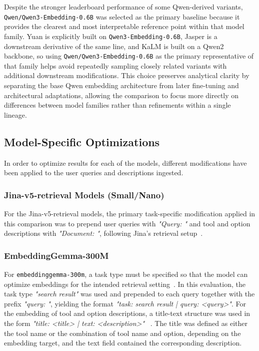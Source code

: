 Despite the stronger leaderboard performance of some Qwen-derived variants, \texttt{Qwen/Qwen3-Embedding-0.6B} was selected as the primary baseline because it provides the clearest and most interpretable reference point within that model family. Yuan is explicitly built on \texttt{Qwen3-Embedding-0.6B}, Jasper is a downstream derivative of the same line, and KaLM is built on a Qwen2 backbone, so using \texttt{Qwen/Qwen3-Embedding-0.6B} as the primary representative of that family helps avoid repeatedly sampling closely related variants with additional downstream modifications. This choice preserves analytical clarity by separating the base Qwen embedding architecture from later fine-tuning and architectural adaptations, allowing the comparison to focus more directly on differences between model families rather than refinements within a single lineage.

\subsection{Model-Specific Optimizations}\label{sec:model_spec_opt}

In order to optimize results for each of the models, different modifications have been applied to the user queries and descriptions ingested.

\subsubsection{Jina-v5-retrieval Models (Small/Nano)}
For the Jina-v5-retrieval models, the primary task-specific modification applied in this comparison was to prepend user queries with \textit{"Query: "} and tool and option descriptions with \textit{"Document: "}, following Jina's retrieval setup~\cite{akram2026jina}.

\subsubsection{EmbeddingGemma-300M}
For \texttt{embeddinggemma-300m}, a task type must be specified so that the model can optimize embeddings for the intended retrieval setting~\cite{vera2025embeddinggemma}. In this evaluation, the task type \textit{"search result"} was used and prepended to each query together with the prefix \textit{"query: "}, yielding the format \textit{"task: search result | query: <query>"}. For the embedding of tool and option descriptions, a title-text structure was used in the form \textit{"title: <title> | text: <description>"} ~\cite{vera2025embeddinggemma}. The title was defined as either the tool name or the combination of tool name and option, depending on the embedding target, and the text field contained the corresponding description.

